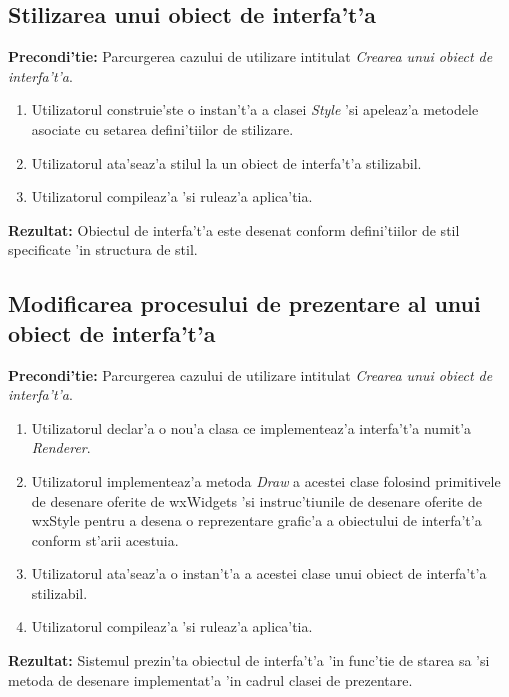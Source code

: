 \subsection{Stilizarea unui obiect de interfa't'a}
\textbf{Precondi'tie:} Parcurgerea cazului de utilizare intitulat \emph{Crearea unui obiect de interfa't'a}.

\begin{enumerate}
\item Utilizatorul construie'ste o instan't'a a clasei \emph{Style} 'si apeleaz'a metodele asociate cu setarea defini'tiilor de stilizare.
\item Utilizatorul ata'seaz'a stilul la un obiect de interfa't'a stilizabil.
\item Utilizatorul compileaz'a 'si ruleaz'a aplica'tia.
\end{enumerate}
\textbf{Rezultat:} Obiectul de interfa't'a este desenat conform defini'tiilor de stil specificate 'in structura de stil.

\subsection{Modificarea procesului de prezentare al unui obiect de interfa't'a}
\textbf{Precondi'tie:} Parcurgerea cazului de utilizare intitulat \emph{Crearea unui obiect de interfa't'a}.
\begin{enumerate}
\item Utilizatorul declar'a o nou'a clasa ce implementeaz'a interfa't'a numit'a \emph{Renderer}.
\item Utilizatorul implementeaz'a metoda \emph{Draw} a acestei clase folosind primitivele de desenare oferite de wxWidgets 'si instruc'tiunile de desenare oferite de wxStyle pentru a desena o reprezentare grafic'a a obiectului de interfa't'a conform st'arii acestuia.
\item Utilizatorul ata'seaz'a o instan't'a a acestei clase unui obiect de interfa't'a stilizabil.
\item Utilizatorul compileaz'a 'si ruleaz'a aplica'tia.
\end{enumerate}
\textbf{Rezultat:} Sistemul prezin'ta obiectul de interfa't'a 'in func'tie de starea sa 'si metoda de desenare implementat'a 'in cadrul clasei de prezentare.

